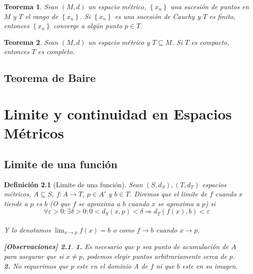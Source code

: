 \documentclass[oneside]{book} %
\theoremstyle{Teorema}
\newtheorem{Definicion}{Definición}[chapter]
\newtheorem{Teorema}[Definicion]{Teorema}
\theoremstyle{Ejemplos}
\theoremstyle{[Obs]}
\newtheorem*{Obs}{[Observaciones]}
\renewcommand{\{}{\left\lbrace} %
\renewcommand{\}}{\right\rbrace} %
\renewcommand{\sc}{\subseteq} %
\begin{document}
			\begin{Teorema}
				
				Sean $(M, d)$ un espacio métrico, $\{ x_n \}$ una sucesión de puntos en $M$ y $T$ el rango de $\{ x_n \}$. Si $\{ x_n \}$ es una sucesión de Cauchy y $T$ es finito, entonces $\{ x_n \}$ converge a algún punto $p \in T$. \\

			\end{Teorema}

			\begin{Teorema}
				
				Sean $(M, d)$ un espacio métrico y $T \sc M$. Si $T$ es compacto, entonces $T$ es completo. \\

			\end{Teorema}

		\section{Teorema de Baire}

	\chapter{Limite y continuidad en Espacios Métricos}
		
		\section{Limite de una función}

			\begin{Definicion}[Limite de una función]
				
				Sean $(S, d_S), (T, d_T)$ espacios métricos, $A \sc S$, $f : A \to T$, $p \in A'$ y $b \in T$. Diremos que el limite de $f$ cuando $x$ tiende a $p$ es $b$ (O que $f$ se aproxima a $b$ cuando $x$ se aproxima a $p$) si \\

				\[ \forall \varepsilon > 0 : \exists \delta > 0 : 0 < d_S(x, p) < \delta \Rightarrow d_T(f(x), b) < \varepsilon \] \\

				Y lo denotamos $\displaystyle\lim_{x \to p} f(x) = b$ o como $f \to b$ cuando $x \to p$. \\

				\begin{Obs}
				
					\hfill

					\textbf{1.} Es necesario que $p$ sea punto de acumulación de $A$ para asegurar que si $x \neq p$, podemos elegir puntos arbitrariamente cerca de $p$. \\

					\textbf{2.} No requerimos que $p$ este en el dominio $A$ de $f$ ni que $b$ este en su imagen. \\
				
				\end{Obs}

			\end{Definicion}
\end{document}
